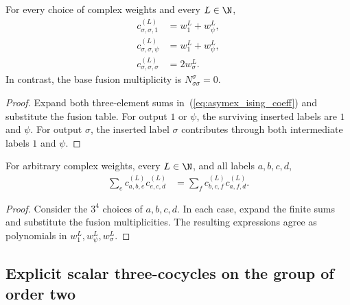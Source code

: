 \begin{theorem}
    \label{thm:asymex_ising_sigma}
    \leanok
    For every choice of complex weights and every $L\in\N$,
    \begin{align}
        c_{\sigma,\sigma,1}^{(L)}      & =w_1^L+w_\psi^L, \\
        c_{\sigma,\sigma,\psi}^{(L)}   & =w_1^L+w_\psi^L, \\
        c_{\sigma,\sigma,\sigma}^{(L)} & =2w_\sigma^L.
    \end{align}
    In contrast, the base fusion multiplicity is
    $N_{\sigma\sigma}^{\sigma}=0$.
\end{theorem}
\begin{proof}
    \leanok
    Expand both three-element sums in~(\ref{eq:asymex_ising_coeff})
    and substitute the fusion table. For output $1$ or $\psi$, the
    surviving inserted labels are $1$ and $\psi$. For output $\sigma$,
    the inserted label $\sigma$ contributes through both intermediate
    labels $1$ and $\psi$.
\end{proof}

\begin{theorem}
    \label{thm:asymex_ising_assoc}
    \leanok
    For arbitrary complex weights, every $L\in\N$, and all labels
    $a,b,c,d$,
    \begin{align}
        \sum_e c_{a,b,e}^{(L)}c_{e,c,d}^{(L)}
         & =\sum_f c_{b,c,f}^{(L)}c_{a,f,d}^{(L)}.
    \end{align}
\end{theorem}
\begin{proof}
    \leanok
    Consider the $3^4$ choices of $a,b,c,d$. In each case, expand
    the finite sums and substitute the fusion multiplicities.
    The resulting expressions agree as polynomials in
    $w_1^L,w_\psi^L,w_\sigma^L$.
\end{proof}

\subsection{Explicit scalar three-cocycles on the group of order two}

